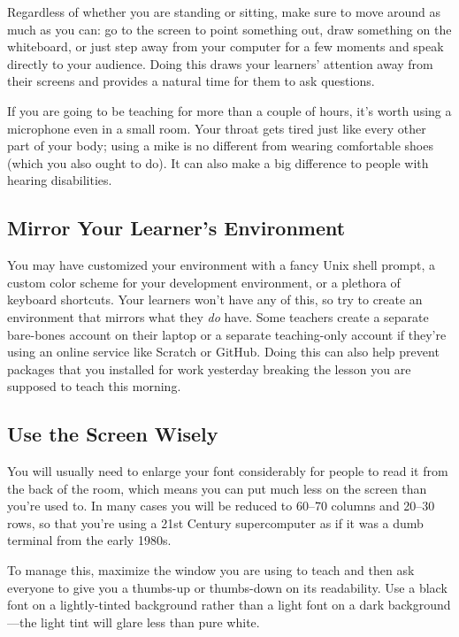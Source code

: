 Regardless of whether you are standing or sitting,
make sure to move around as much as you can:
go to the screen to point something out,
draw something on the whiteboard,
or just step away from your computer for a few moments and speak directly to your audience.
Doing this draws your learners' attention away from their screens
and provides a natural time for them to ask questions.

If you are going to be teaching for more than a couple of hours,
it's worth using a microphone even in a small room.
Your throat gets tired just like every other part of your body;
using a mike is no different from wearing comfortable shoes
(which you also ought to do).
It can also make a big difference to people with hearing disabilities.

\subsection*{Mirror Your Learner's Environment}

You may have customized your environment with a fancy Unix shell prompt,
a custom color scheme for your development environment,
or a plethora of keyboard shortcuts.
Your learners won't have any of this,
so try to create an environment that mirrors what they \emph{do} have.
Some teachers create a separate bare-bones account on their laptop
or a separate teaching-only account
if they're using an online service like Scratch or GitHub.
Doing this can also help prevent packages that you installed for work yesterday
breaking the lesson you are supposed to teach this morning.

\subsection*{Use the Screen Wisely}

You will usually need to enlarge your font considerably
for people to read it from the back of the room,
which means you can put much less on the screen than you're used to.
In many cases you will be reduced to 60--70 columns and 20--30 rows,
so that you're using a 21st Century supercomputer
as if it was a dumb terminal from the early 1980s.

To manage this,
maximize the window you are using to teach
and then ask everyone to give you a thumbs-up or thumbs-down on its readability.
Use a black font on a lightly-tinted background
rather than a light font on a dark background---the light tint will glare less
than pure white.

